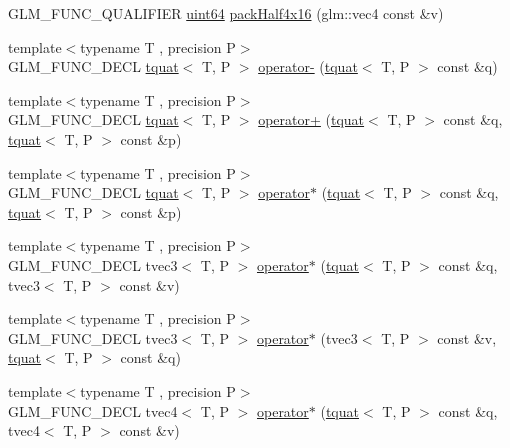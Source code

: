 \begin{DoxyCompactItemize}
\item 
G\+L\+M\+\_\+\+F\+U\+N\+C\+\_\+\+Q\+U\+A\+L\+I\+F\+I\+E\+R \hyperlink{group__gtc__type__precision_gae3632bf9b37da66233d78930dd06378a}{uint64} \hyperlink{namespaceglm_a670e1c579209ce012e384819ceb829b6}{pack\+Half4x16} (glm\+::vec4 const \&v)
\item 
{\footnotesize template$<$typename T , precision P$>$ }\\G\+L\+M\+\_\+\+F\+U\+N\+C\+\_\+\+D\+E\+C\+L \hyperlink{structglm_1_1tquat}{tquat}$<$ T, P $>$ \hyperlink{group__gtc__quaternion_ga64cdb5fcebb192579798cfe79670239f}{operator-\/} (\hyperlink{structglm_1_1tquat}{tquat}$<$ T, P $>$ const \&q)
\item 
{\footnotesize template$<$typename T , precision P$>$ }\\G\+L\+M\+\_\+\+F\+U\+N\+C\+\_\+\+D\+E\+C\+L \hyperlink{structglm_1_1tquat}{tquat}$<$ T, P $>$ \hyperlink{group__gtc__quaternion_ga517657374d8ca180d63c33ff9430518a}{operator+} (\hyperlink{structglm_1_1tquat}{tquat}$<$ T, P $>$ const \&q, \hyperlink{structglm_1_1tquat}{tquat}$<$ T, P $>$ const \&p)
\item 
{\footnotesize template$<$typename T , precision P$>$ }\\G\+L\+M\+\_\+\+F\+U\+N\+C\+\_\+\+D\+E\+C\+L \hyperlink{structglm_1_1tquat}{tquat}$<$ T, P $>$ \hyperlink{group__gtc__quaternion_gabca7455f687e322b505531e15786d845}{operator$\ast$} (\hyperlink{structglm_1_1tquat}{tquat}$<$ T, P $>$ const \&q, \hyperlink{structglm_1_1tquat}{tquat}$<$ T, P $>$ const \&p)
\item 
{\footnotesize template$<$typename T , precision P$>$ }\\G\+L\+M\+\_\+\+F\+U\+N\+C\+\_\+\+D\+E\+C\+L tvec3$<$ T, P $>$ \hyperlink{group__gtc__quaternion_ga5b0cccc7f163f2b7bbf3536deb403d9a}{operator$\ast$} (\hyperlink{structglm_1_1tquat}{tquat}$<$ T, P $>$ const \&q, tvec3$<$ T, P $>$ const \&v)
\item 
{\footnotesize template$<$typename T , precision P$>$ }\\G\+L\+M\+\_\+\+F\+U\+N\+C\+\_\+\+D\+E\+C\+L tvec3$<$ T, P $>$ \hyperlink{group__gtc__quaternion_ga70dbac44fc9fb59659218ad4ed7870ed}{operator$\ast$} (tvec3$<$ T, P $>$ const \&v, \hyperlink{structglm_1_1tquat}{tquat}$<$ T, P $>$ const \&q)
\item 
{\footnotesize template$<$typename T , precision P$>$ }\\G\+L\+M\+\_\+\+F\+U\+N\+C\+\_\+\+D\+E\+C\+L tvec4$<$ T, P $>$ \hyperlink{group__gtc__quaternion_gaeee3d385665cb25b6d728524b8d8fa66}{operator$\ast$} (\hyperlink{structglm_1_1tquat}{tquat}$<$ T, P $>$ const \&q, tvec4$<$ T, P $>$ const \&v)

\end{DoxyCompactItemize}

